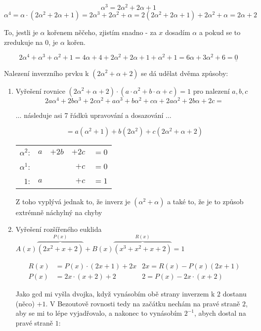 \documentclass{article}
\begin{document}
\[ \alpha^3 = 2\alpha^2 + 2\alpha + 1 \]
\[ \alpha^4 = \alpha \cdot(2\alpha^2 + 2\alpha + 1) = 2\alpha^3 + 2\alpha^2 + \alpha = 2(2\alpha^2 + 2\alpha + 1) + 2\alpha^2 + \alpha = 2\alpha + 2\]

To, jestli je $\alpha$ kořenem něčeho, zjistím snadno - za $x$ dosadím $\alpha$ a pokud se to zredukuje na $0$, je $\alpha$ kořen.

\[ 2\alpha^4 + \alpha^3 + \alpha^2 + 1 = 4\alpha + 4 + 2\alpha^2 + 2\alpha + 1 + \alpha^2 + 1 = 6\alpha + 3\alpha^2 + 6 = \underline{0} \]

Nalezení inverzního prvku k $(2\alpha^2 + \alpha + 2)$ se dá udělat dvěma způsoby:

\begin{enumerate}
	\item Vyřešení rovnice $(2\alpha^2 + \alpha + 2)\cdot( a\cdot \alpha^2 + b \cdot \alpha + c) = 1$ pro nalezení $a,b,c$
	\[ 2a\alpha^4 + 2b\alpha^3 + 2c\alpha^2 + a\alpha^3 + b\alpha^2 + c\alpha + 2a\alpha^2 + 2b\alpha + 2c = \]
	\begin{center}
		$\ldots$ následuje asi 7 řádků upravování a dosazování $\ldots$
	\end{center}
	\[ = a(\alpha^2 + 1) + b(2\alpha^2) + c(2\alpha^2 + \alpha + 2) \]
	
	\begin{center}
		\begin{tabular}{r|rrrl}
			$\alpha^2$: & $a$ 	& $+ 2b$ 	& $+ 2c$ 	& $= 0$ \\
			$\alpha^1$: &  			&					&	$+ c$		&	$= 0$ \\
			$1$: 				& $a$		&					&	$+ c$		&	$= 1$ \\
		\end{tabular}
	\end{center}
	Z toho vyplývá jednak to, že inverz je $(\alpha^2 + \alpha)$ a také to, že je to způsob extrémně náchylný na chyby
	\item Vyřešení rozšířeného euklida $A(x)\overbrace{(2x^2 + x + 2)}^{P(x)} + B(x)\overbrace{(x^3 + x^2 + x + 2)}^{R(x)} = 1$
	
\begin{align*}
R(x) 	& = P(x)\cdot(2x+1) + 2x 	& 2x = R(x) - P(x)(2x+1) \\
P(x)	& = 2x\cdot(x+2)+2 				& 2 = P(x) - 2x\cdot(x+2)
\end{align*}

Jako gcd mi vyšla dvojka, když vynásobím obě strany inverzem k $2$ dostanu (něco) $+ 1$. V Bezoutově rovnosti tedy na začátku nechám na pravé straně $2$, aby se mi to lépe vyjadřovalo, a nakonec to vynásobím $2^{-1}$, abych dostal na pravé straně $1$:


\end{enumerate}
\end{document}

